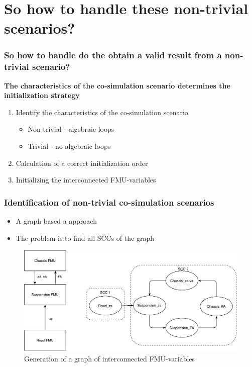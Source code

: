 \documentclass{beamer}
\begin{document}
\section{So how to handle these non-trivial scenarios?}
\begin{frame}
\frametitle{So how to handle do the obtain a valid result from a non-trivial scenario?}
\textbf{The characteristics of the co-simulation scenario determines the initialization strategy}
\begin{enumerate}[I]
    \item Identify the characteristics of the co-simulation scenario
    \begin{itemize}
        \item Non-trivial - algebraic loops
        \item Trivial - no algebraic loops
    \end{itemize}
    \item Calculation of a correct initialization order
    \item Initializing the interconnected FMU-variables
\end{enumerate}
\end{frame}

\begin{frame}
\frametitle{Identification of non-trivial co-simulation scenarios}
\begin{itemize}
    \item A graph-based a approach 
    \item The problem is to find all SCCs of the graph
\end{itemize}
\begin{figure}
    \centering
    \includegraphics[scale=0.6]{images/quarter_car_SCC.pdf}
    \caption{Generation of a graph of interconnected FMU-variables}
\end{figure}
\end{frame}
\end{document}
